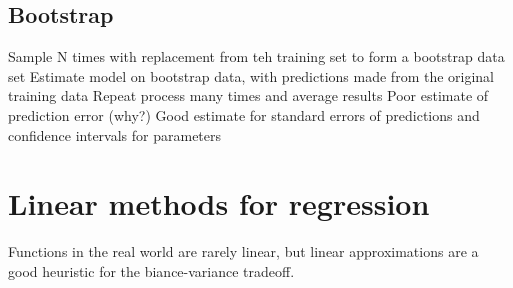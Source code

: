 \documentclass{article}
\begin{document}
\subsection{Bootstrap}
Sample N times with replacement from teh training set to form a bootstrap data set
Estimate model on bootstrap data, with predictions made from the original training data
Repeat process many times and average results
Poor estimate of prediction error (why?)
Good estimate for standard errors of predictions and confidence intervals for parameters



\section{Linear methods for regression}
Functions in the real world are rarely linear, but linear approximations are a good heuristic for the biance-variance tradeoff.
\end{document}
